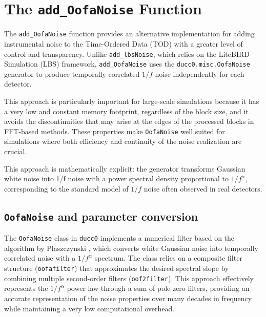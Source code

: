 \section{The \texttt{add\_OofaNoise} Function}

The \texttt{add\_OofaNoise} function provides an alternative implementation for adding instrumental noise to the Time-Ordered Data (TOD) with a greater level of control and transparency. Unlike \texttt{add\_lbsNoise}, which relies on the LiteBIRD Simulation (LBS) framework, \texttt{add\_OofaNoise} uses the \texttt{ducc0.misc.OofaNoise} generator to produce temporally correlated $1/f$ noise independently for each detector.

This approach is particularly important for large-scale simulations because it has a very low and constant memory footprint, regardless of the block size, and it avoids the discontinuities that may arise at the edges of the processed blocks in FFT-based methods. These properties make \texttt{OofaNoise} well suited for simulations where both efficiency and continuity of the noise realization are crucial.

This approach is mathematically explicit: the generator transforms Gaussian white noise into 1/f noise with a power spectral density proportional to $1/f^\alpha$, corresponding to the standard model of $1/f$ noise often observed in real detectors.


\subsection{\texttt{OofaNoise} and parameter conversion}
The \texttt{OofaNoise} class in \texttt{ducc0} implements a numerical filter based on the algorithm by Plaszczynski \cite{PLASZCZYNSKI2007}, which converts white Gaussian noise into temporally correlated noise with a $1/f^\alpha$ spectrum. The class relies on a composite filter structure (\texttt{oofafilter}) that approximates the desired spectral slope by combining multiple second-order filters (\texttt{oof2filter}). This approach effectively represents the $1/f^\alpha$ power law through a sum of pole-zero filters, providing an accurate representation of the noise properties over many decades in frequency while maintaining a very low computational overhead.

